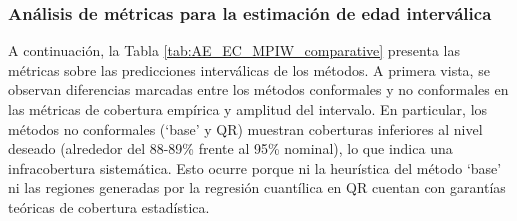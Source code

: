\subsubsection{Análisis de métricas para la estimación de edad interválica}

A continuación, la Tabla \ref{tab:AE_EC_MPIW_comparative} presenta las métricas sobre las predicciones interválicas de los métodos. A primera vista, se observan diferencias marcadas entre los métodos conformales y no conformales en las métricas de cobertura empírica y amplitud del intervalo. En particular, los métodos no conformales (`base' y QR) muestran coberturas inferiores al nivel deseado (alrededor del 88-89\% frente al 95\% nominal), lo que indica una infracobertura sistemática. Esto ocurre porque ni la heurística del método `base' ni las regiones generadas por la regresión cuantílica en QR cuentan con garantías teóricas de cobertura estadística.

